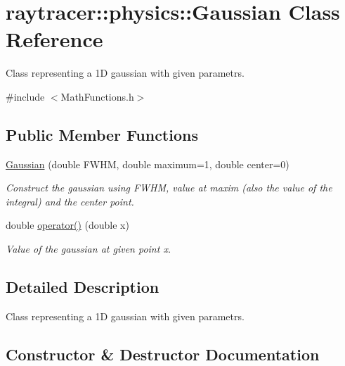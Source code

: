\hypertarget{classraytracer_1_1physics_1_1Gaussian}{}\section{raytracer\+:\+:physics\+:\+:Gaussian Class Reference}
\label{classraytracer_1_1physics_1_1Gaussian}


Class representing a 1D gaussian with given parametrs.  




{\ttfamily \#include $<$Math\+Functions.\+h$>$}

\subsection*{Public Member Functions}
\begin{DoxyCompactItemize}
\item 
\hyperlink{classraytracer_1_1physics_1_1Gaussian_a00e90848da44684d9d28cc65e1c2a3dd}{Gaussian} (double F\+W\+HM, double maximum=1, double center=0)
\begin{DoxyCompactList}\small\item\em Construct the gaussian using F\+W\+HM, value at maxim (also the value of the integral) and the center point. \end{DoxyCompactList}\item 
double \hyperlink{classraytracer_1_1physics_1_1Gaussian_a1dfe468b7771b65007f31c9e9c746fce}{operator()} (double x)
\begin{DoxyCompactList}\small\item\em Value of the gaussian at given point x. \end{DoxyCompactList}\end{DoxyCompactItemize}


\subsection{Detailed Description}
Class representing a 1D gaussian with given parametrs. 

\subsection{Constructor \& Destructor Documentation}
\mbox{\label{classraytracer_1_1physics_1_1Gaussian_a00e90848da44684d9d28cc65e1c2a3dd}} 

